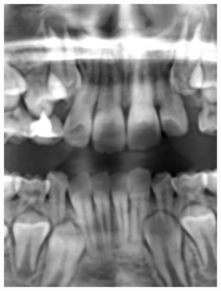 \documentclass[a4paper,titlepage,12pt]{article}
\begin{document}
\begin{figure}
\begin{minipage}[b]{0.23\linewidth}
		\includegraphics[width=\linewidth]{preprocess/hats.png}
	\end{minipage}
	\begin{minipage}[b]{0.23\linewidth}

\end{minipage}
\end{figure}
\end{document}
